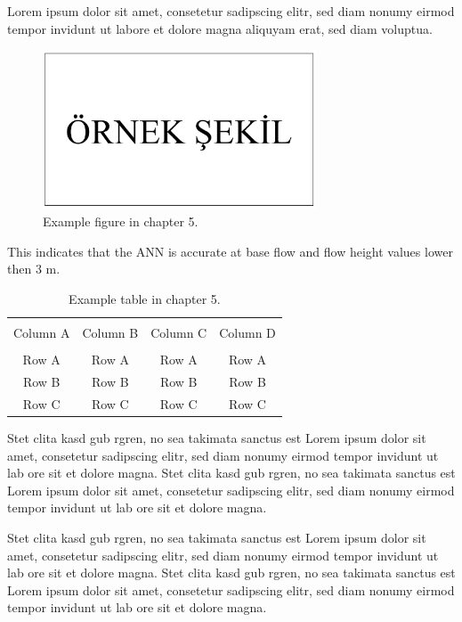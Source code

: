 
Lorem ipsum dolor sit amet, consetetur sadipscing elitr, sed diam nonumy eirmod tempor invidunt ut labore et dolore magna aliquyam erat, sed diam voluptua.

\begin{figure}
	\centering
	\includegraphics[width=230pt,keepaspectratio=true]{./fig/sekil5}
	\vspace{3mm}
	\caption{Example figure in chapter 5.}
	\label{Figure5.1}
\end{figure}

This indicates that the ANN is accurate at base flow and flow height values lower then 3 m. 

\begin{table}[h]
	{\setlength{\tabcolsep}{14pt}
		\caption{Example table in chapter 5.}
		\begin{center}
			\vspace{-6mm}
			\begin{tabular}{cccc}
			    \hline \\[-2.45ex] \hline \\[-2.1ex]
				Column A & Column B & Column C & Column D \\
				\hline \\[-1.8ex]
				Row A & Row A & Row A & Row A \\
				Row B & Row B & Row B & Row B \\
				Row C & Row C & Row C & Row C \\
				[-0ex] \hline
			\end{tabular}
			\vspace{-6mm}
		\end{center}
		\label{Table5.1}}
\end{table}

Stet clita kasd gub rgren, no sea takimata sanctus est Lorem ipsum dolor sit amet, consetetur sadipscing elitr, sed diam nonumy eirmod tempor invidunt ut lab ore sit et dolore magna. Stet clita kasd gub rgren, no sea takimata sanctus est Lorem ipsum dolor sit amet, consetetur sadipscing elitr, sed diam nonumy eirmod tempor invidunt ut lab ore sit et dolore magna.
 
Stet clita kasd gub rgren, no sea takimata sanctus est Lorem ipsum dolor sit amet, consetetur sadipscing elitr, sed diam nonumy eirmod tempor invidunt ut lab ore sit et dolore magna. Stet clita kasd gub rgren, no sea takimata sanctus est Lorem ipsum dolor sit amet, consetetur sadipscing elitr, sed diam nonumy eirmod tempor invidunt ut lab ore sit et dolore magna. 
